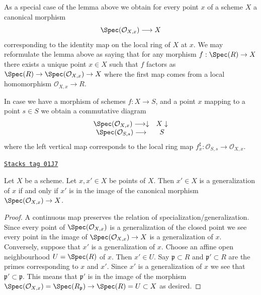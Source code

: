 As a special case of the lemma above we obtain for every
point $x$ of a scheme $X$ a canonical morphism
\begin{equation}
\label{equation-canonical-morphism}
\Spec(\mathcal{O}_{X, x}) \longrightarrow X
\end{equation}
corresponding to the identity map on the local ring of $X$ at $x$.
We may reformulate the lemma above as saying that for any
morphism $f : \Spec(R) \to X$ there exists a unique point
$x \in X$ such that $f$ factors as
$\Spec(R) \to \Spec(\mathcal{O}_{X, x}) \to X$
where the first map comes from a local homomorphism
$\mathcal{O}_{X, x} \to R$.

\medskip\noindent
In case we have a morphism of schemes $f : X \to S$,
and a point $x$ mapping to a point $s \in S$ we obtain
a commutative diagram
$$
\begin{array}{cc}\Spec(\mathcal{O}_{X, x}) \longrightarrow\downarrow & X \downarrow \\ \Spec(\mathcal{O}_{S, s}) \longrightarrow & S\end{array}
$$
where the left vertical map corresponds to the local ring map
$f^\sharp_x : \mathcal{O}_{S, s} \to \mathcal{O}_{X, x}$.

\begin{lemma}
\label{schemes-lemma-specialize-points}
\href{https://stacks.math.columbia.edu/tag/01J7}{\texttt{Stacks tag 01J7}}

Let $X$ be a scheme.
Let $x, x' \in X$ be points of $X$.
Then $x' \in X$ is a generalization of $x$ if and only if
$x'$ is in the image of the canonical morphism
$\Spec(\mathcal{O}_{X, x}) \to X$.
\end{lemma}

\begin{proof}
A continuous map preserves the relation of specialization/generalization.
Since every point of $\Spec(\mathcal{O}_{X, x})$ is a
generalization of the closed point we see every point in the image
of $\Spec(\mathcal{O}_{X, x}) \to X$ is a generalization of $x$.
Conversely, suppose that $x'$ is a generalization of $x$.
Choose an affine open neighbourhood $U = \Spec(R)$ of
$x$. Then $x' \in U$. Say $\mathfrak p \subset R$ and
$\mathfrak p' \subset R$ are the primes corresponding
to $x$ and $x'$. Since $x'$ is a generalization of $x$
we see that $\mathfrak p' \subset \mathfrak p$. This means
that $\mathfrak p'$ is in the image of the morphism
$\Spec(\mathcal{O}_{X, x}) = \Spec(R_{\mathfrak p})
\to \Spec(R) = U \subset X$ as desired.
\end{proof}

